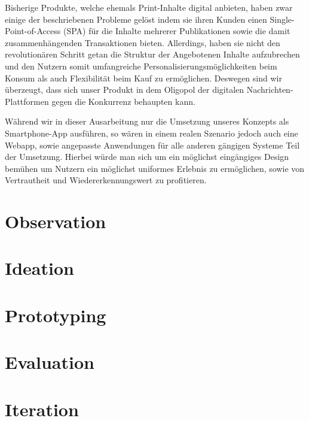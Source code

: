 Bisherige Produkte, welche ehemals Print-Inhalte digital anbieten, haben zwar einige der beschriebenen Probleme gelöst indem sie ihren Kunden einen Single-Point-of-Access (SPA) für die Inhalte mehrerer Publikationen sowie die damit zusammenhängenden Transaktionen bieten. Allerdings, haben sie nicht den revolutionären Schritt getan die Struktur der Angebotenen Inhalte aufzubrechen und den Nutzern somit umfangreiche Personalisierungsmöglichkeiten beim Konsum als auch Flexibilität beim Kauf zu ermöglichen. Deswegen sind wir überzeugt, dass sich unser Produkt in dem Oligopol der digitalen Nachrichten-Plattformen gegen die Konkurrenz behaupten kann.

Während wir in dieser Ausarbeitung nur die Umsetzung unseres Konzepts als Smartphone-App ausführen, so wären in einem realen Szenario jedoch auch eine Webapp, sowie angepasste Anwendungen für alle anderen gängigen Systeme Teil der Umsetzung. Hierbei würde man sich um ein möglichst eingängiges Design bemühen um Nutzern ein möglichst uniformes Erlebnis zu ermöglichen, sowie von Vertrautheit und Wiedererkennungswert zu profitieren.

\section{Observation}
\section{Ideation}
\section{Prototyping}
\section{Evaluation}
\section{Iteration}